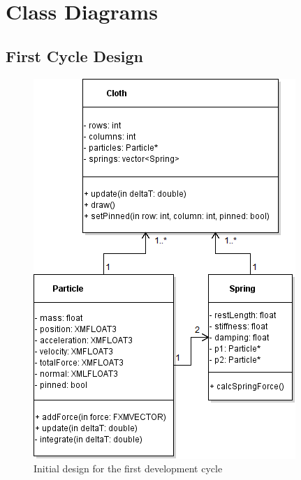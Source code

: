 \chapter{Class Diagrams}

\section{First Cycle Design}
\label{sec:appendix1}
  \begin{figure}[!htb]
    \begin{center}
      \includegraphics[scale=0.66]{Figures/cycle_1_initial_design}
    \end{center}
    \caption{Initial design for the first development cycle}
    \label{fig:phase1 initial}
  \end{figure}
  
